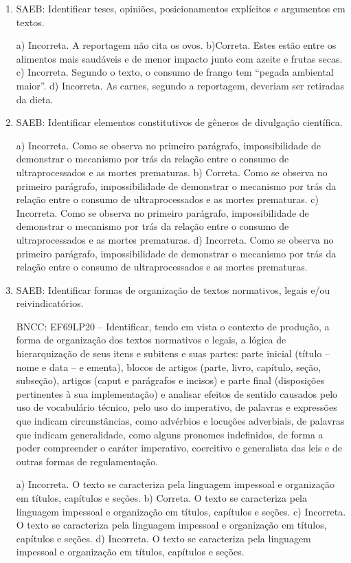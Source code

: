 \begin{enumerate}

	\item
SAEB: Identificar teses, opiniões, posicionamentos explícitos e
argumentos em textos.

a) Incorreta. A reportagem não cita os ovos.
b)Correta. Estes estão entre os alimentos mais saudáveis e de menor
impacto junto com azeite e frutas secas.
c) Incorreta. Segundo o texto, o consumo de frango tem ``pegada ambiental
maior''.
d) Incorreta. As carnes, segundo a reportagem, deveriam ser retiradas
da dieta.

	\item
SAEB: Identificar elementos constitutivos de gêneros de divulgação científica.

a) Incorreta. Como se observa no primeiro parágrafo, impossibilidade de demonstrar o mecanismo por trás da relação entre o consumo de ultraprocessados e as mortes prematuras.
b) Correta. Como se observa no primeiro parágrafo, impossibilidade de demonstrar o mecanismo por trás da relação entre o consumo de ultraprocessados e as mortes prematuras.
c) Incorreta. Como se observa no primeiro parágrafo, impossibilidade de demonstrar o mecanismo por trás da relação entre o consumo de ultraprocessados e as mortes prematuras.
d) Incorreta. Como se observa no primeiro parágrafo, impossibilidade de demonstrar o mecanismo por trás da relação entre o consumo de ultraprocessados e as mortes prematuras.

	\item
SAEB:  Identificar formas de organização de textos normativos, legais
e/ou reivindicatórios.

BNCC: EF69LP20 -- Identificar, tendo em vista o contexto de produção, a
forma de organização dos textos normativos e legais, a lógica de
hierarquização de seus itens e subitens e suas partes: parte inicial
(título -- nome e data -- e ementa), blocos de artigos (parte, livro,
capítulo, seção, subseção), artigos (caput e parágrafos e incisos) e
parte final (disposições pertinentes à sua implementação) e analisar
efeitos de sentido causados pelo uso de vocabulário técnico, pelo uso do
imperativo, de palavras e expressões que indicam circunstâncias, como
advérbios e locuções adverbiais, de palavras que indicam generalidade,
como alguns pronomes indefinidos, de forma a poder compreender o caráter
imperativo, coercitivo e generalista das leis e de outras formas de
regulamentação.

a) Incorreta. O texto se caracteriza pela linguagem impessoal e organização em 
títulos, capítulos e seções.
b) Correta. O texto se caracteriza pela linguagem impessoal e organização em 
títulos, capítulos e seções. 
c) Incorreta. O texto se caracteriza pela linguagem impessoal e organização em 
títulos, capítulos e seções. 
d) Incorreta. O texto se caracteriza pela linguagem impessoal e organização em 
títulos, capítulos e seções.


\end{enumerate}
